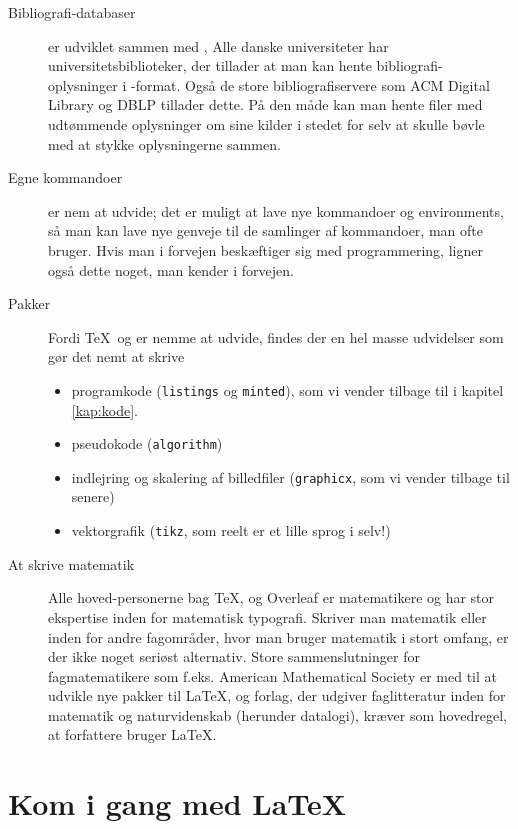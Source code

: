 \begin{description}
\item[Bibliografi-databaser] \latex  er udviklet sammen med \bibtex, Alle danske universiteter har
  universitetsbiblioteker, der tillader at man kan hente
  bibliografi-oplysninger i \bibtex-format. Også de store
  bibliografiservere som ACM Digital Library \cite{acmdl} og DBLP
  \cite{dblp} tillader dette. På den måde kan man hente filer med
  udtømmende oplysninger om sine
  kilder i stedet for selv at skulle bøvle med at stykke oplysningerne sammen.

\item[Egne kommandoer] \latex  er nem at udvide; det er muligt at lave
  nye kommandoer og environments, så man kan lave nye genveje til de
  samlinger af kommandoer, man ofte bruger. Hvis man i forvejen
  beskæftiger sig med programmering, ligner også dette noget, man
  kender i forvejen.
  
\item[Pakker] Fordi \TeX\ og \latex er nemme at udvide, findes der en
  hel masse udvidelser som gør det nemt at skrive

  \begin{itemize}
  \item programkode (\texttt{listings} og \texttt{minted}), som vi
    vender tilbage til i kapitel \ref{kap:kode}.
  \item pseudokode (\texttt{algorithm})
  \item indlejring og skalering af billedfiler (\texttt{graphicx}, som
    vi vender tilbage til senere)
  \item vektorgrafik (\texttt{tikz}, som reelt er et lille sprog i selv!)    
  \end{itemize}

\item[At skrive matematik] Alle hoved-personerne bag \TeX, \latex  og
  Overleaf er matematikere og har stor ekspertise inden for matematisk
  typografi. Skriver man matematik eller inden for andre fagområder,
  hvor man bruger matematik i stort omfang, er der ikke noget seriøst
  alternativ. Store sammenslutninger for fagmatematikere
  som f.eks. American Mathematical Society er med til at udvikle nye
  pakker til \LaTeX, og forlag, der udgiver faglitteratur inden for
  matematik og naturvidenskab (herunder datalogi), kræver som
  hovedregel, at forfattere bruger \LaTeX.
\end{description}

\section{Kom i gang med \LaTeX} \label{afs:komigang}

